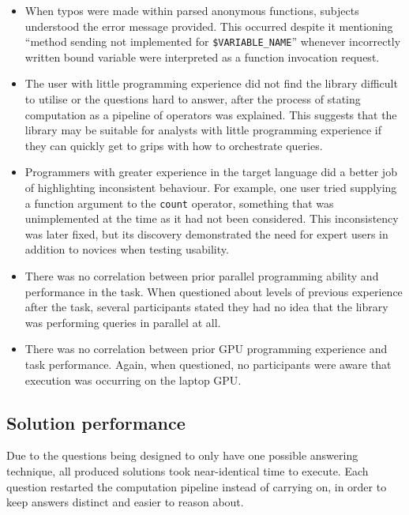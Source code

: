 \begin{itemize}
  \item  When typos were made within parsed anonymous functions, subjects understood the error message provided. This occurred despite it mentioning ``method sending not implemented for \verb|$VARIABLE_NAME|'' whenever incorrectly written bound variable were interpreted as a function invocation request.

  \item The user with little programming experience did not find the library difficult to utilise or the questions hard to answer, after the process of stating computation as a pipeline of operators was explained. This suggests that the library may be suitable for analysts with little programming experience if they can quickly get to grips with how to orchestrate queries.

  \item Programmers with greater experience in the target language did a better job of highlighting inconsistent behaviour. For example, one user tried supplying a function argument to the \verb|count| operator, something that was unimplemented at the time as it had not been considered. This inconsistency was later fixed, but its discovery demonstrated the need for expert users in addition to novices when testing usability.

  \item There was no correlation between prior parallel programming ability and performance in the task. When questioned about levels of previous experience after the task, several participants stated they had no idea that the library was performing queries in parallel at all.

  \item There was no correlation between prior \ac{GPU} programming experience and task performance. Again, when questioned, no participants were aware that execution was occurring on the laptop \ac{GPU}.

\end{itemize}

\subsection{Solution performance}
Due to the questions being designed to only have one possible answering technique, all produced solutions took near-identical time to execute.
Each question restarted the computation pipeline instead of carrying on, in order to keep answers distinct and easier to reason about.

